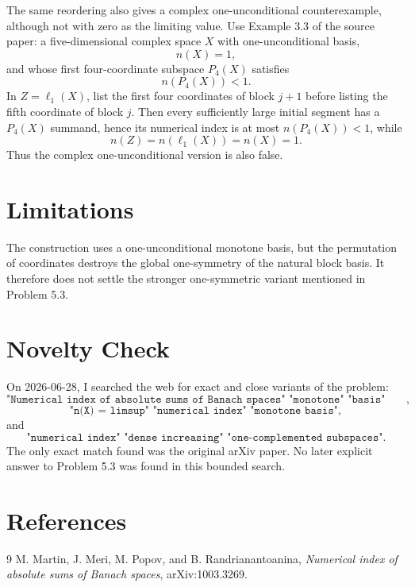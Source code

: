 \documentclass[11pt]{article}
\begin{document}
The same reordering also gives a complex one-unconditional counterexample,
although not with zero as the limiting value. Use Example 3.3 of the source
paper: a five-dimensional complex space \(X\) with one-unconditional basis,
\[
n(X)=1,
\]
and whose first four-coordinate subspace \(P_4(X)\) satisfies
\[
n(P_4(X))<1.
\]
In \(Z=\ell_1(X)\), list the first four coordinates of block \(j+1\) before
listing the fifth coordinate of block \(j\). Then every sufficiently large
initial segment has a \(P_4(X)\) summand, hence its numerical index is at most
\(n(P_4(X))<1\), while
\[
n(Z)=n(\ell_1(X))=n(X)=1.
\]
Thus the complex one-unconditional version is also false.

\section*{Limitations}

The construction uses a one-unconditional monotone basis, but the permutation
of coordinates destroys the global one-symmetry of the natural block basis.
It therefore does not settle the stronger one-symmetric variant mentioned in
Problem 5.3.

\section*{Novelty Check}

On 2026-06-28, I searched the web for exact and close variants of the problem:
\[
\texttt{"Numerical index of absolute sums of Banach spaces" "monotone" "basis" "limsup"},
\]
\[
\texttt{"n(X) = limsup" "numerical index" "monotone basis"},
\]
and
\[
\texttt{"numerical index" "dense increasing" "one-complemented subspaces"}.
\]
The only exact match found was the original arXiv paper. No later explicit
answer to Problem 5.3 was found in this bounded search.

\section*{References}

\begin{thebibliography}{9}
M. Martin, J. Meri, M. Popov, and B. Randrianantoanina,
\emph{Numerical index of absolute sums of Banach spaces},
arXiv:1003.3269.
\end{thebibliography}
\end{document}
